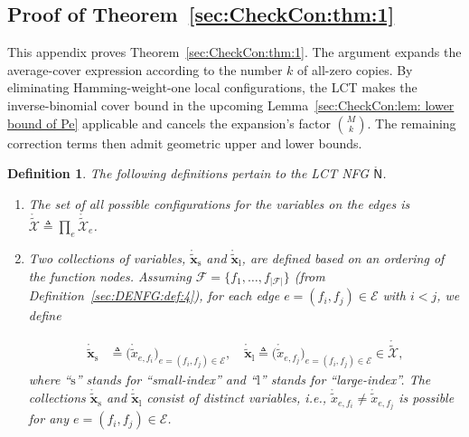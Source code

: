 \documentclass[journal]{IEEEtran}
\newcommand{\add}[1]{{\color{black}#1}}
\newtheorem{definition}[theorem]{Definition}
\newcommand{\vect}[1]{ \bm{#1} }
\newcommand{\set}[1]{\mathcal{#1}}
\newcommand{\setEfull}{ \mathcal{E} }
\newcommand{\sfN}{ \mathsf{N} }
\newcommand{\defeq}{ \triangleq }
\newcommand{\LCTtset}[1]{\mathring{\tilde{\mathcal{#1}}}}
\newcommand{\LCTtv}[1]{ \mathring{ \tilde{ \vect{#1} } } }
\newcommand{\LCT}[1]{ \mathring{#1} }
\newcommand{\LCTt}[1]{ \mathring{ \tilde{#1} } }
\newcommand{\LCTvxl}{ \LCTtv{x}_{\mathrm{l}} }
\newcommand{\LCTvxs}{ \LCTtv{x}_{\mathrm{s}} }
\newcommand*{\ie}{\textit{i.e.}}
\begin{document}
\begin{appendices}
  \section{Proof of Theorem~\ref{sec:CheckCon:thm:1}}
  \label{apx:check_graph_thm}

  \add{This appendix proves Theorem~\ref{sec:CheckCon:thm:1}. The argument
    expands the average-cover expression according to the number $k$ of
    all-zero copies. By eliminating Hamming-weight-one local configurations,
    the LCT makes the inverse-binomial cover bound in the upcoming
    Lemma~\ref{sec:CheckCon:lem: lower bound of Pe} applicable and cancels the
    expansion's factor $\binom{M}{k}$. The remaining correction terms then
    admit geometric upper and lower bounds.}

  \begin{definition}\label{sec:CheckCon:def:1}
    The following definitions pertain to the LCT NFG $ \LCT{\sfN} $.
    \begin{enumerate}

      \item The set of all possible configurations for the variables on the
            edges is $ \LCTtset{X} \defeq \prod_{e} \LCTtset{X}_e$.

      \item Two collections of variables, $ \LCTvxs $ and $ \LCTvxl $, are
            defined based on an ordering of the function nodes. Assuming
            $ \set{F} = \{ f_{1},\ldots,f_{|\set{F}|} \} $ (from
            Definition~\ref{sec:DENFG:def:4}), for each edge
            $e = (f_{i},f_{j}) \in \setEfull$ with $i<j$, we define

            \begin{align*}
              \LCTvxs & \defeq
              \bigl( \LCTt{x}_{e,f_{i}}
              \bigr)_{ e = (f_{i},f_{j}) \in \setEfull },   \quad
              \LCTvxl \defeq \bigl( \LCTt{x}_{e,f_{j}}
                             \bigr)_{ e = (f_{i},f_{j}) \in \setEfull }
              \in \LCTtset{X},
            \end{align*}
            where ``$\mathrm{s}$'' stands for ``small-index'' and
            ``$\mathrm{l}$'' stands for ``large-index''.  The collections
            $ \LCTvxs $ and $\LCTvxl$ consist of distinct variables, \ie,
            $ \LCTt{x}_{e,f_{i}} \neq \LCTt{x}_{e,f_{j}} $ is possible for any
            $ e = (f_{i},f_{j}) \in \setEfull $.


\end{enumerate}
\end{definition}
\end{appendices}
\end{document}
